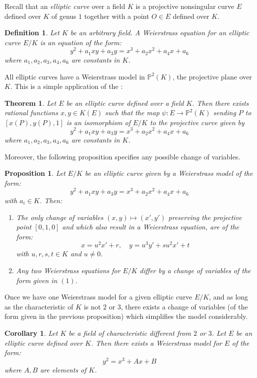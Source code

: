 \documentclass[12pt]{article}
\newtheorem*{thm}{Theorem}
\newtheorem*{defn}{Definition}
\newtheorem{prop}{Proposition}
\newtheorem*{cor}{Corollary}
\theoremstyle{definition}
\begin{document}
Recall that an {\it elliptic curve} over a field $K$ is a projective nonsingular curve $E$ defined over $K$ of genus $1$ together with a point $O\in E$ defined over $K$. 

\begin{defn}
Let $K$ be an arbitrary field. A Weierstrass equation for an elliptic curve $E/K$ is an equation of the form:
$$y^2+a_1xy+a_3y=x^3+a_2x^2+a_4x+a_6$$
where $a_1, a_2, a_3,a_4,a_6$ are constants in $K$.
\end{defn}

All elliptic curves have a Weierstrass model in $\mathbb{P}^2(K)$, the projective plane over $K$. This is a simple application of the :

\begin{thm}
Let $E$ be an elliptic curve defined over a field $K$. Then there exists rational functions $x,y\in K(E)$ such that the map $\psi:E\to \mathbb{P}^2(K)$ sending $P$ to $[x(P),y(P),1]$ is an isomorphism of $E/K$ to the projective curve given by
$$ y^2+a_1xy+a_3y=x^3+a_2x^2+a_4x+a_6$$
where $a_1, a_2, a_3,a_4,a_6$ are constants in $K$.
\end{thm}

Moreover, the following proposition specifies any possible change of variables.
\begin{prop}
\label{change}
Let $E/K$ be an elliptic curve given by a Weierstrass model of the form:
$$ y^2+a_1xy+a_3y=x^3+a_2x^2+a_4x+a_6$$
with $a_i\in K$. Then:
\begin{enumerate}
\item The only change of variables $(x,y)\mapsto (x',y')$ preserving the projective point $[0,1,0]$ and  which also result in a Weierstrass equation, are of the form:
$$x=u^2x'+r,\quad y=u^3y'+su^2x'+t$$ 
with $u,r,s,t\in K$ and $u\neq 0$.

\item Any two Weierstrass equations for $E/K$ differ by a change of variables of the form given in $(1)$.
\end{enumerate}
\end{prop}

Once we have one Weierstrass model for a given elliptic curve $E/K$, and as long as the characteristic of $K$ is not $2$ or $3$, there exists a change of variables (of the form given in the previous proposition) which simplifies the model considerably.

\begin{cor}
Let $K$ be a field of characteristic different from $2$ or $3$. Let $E$ be an elliptic curve defined over $K$. Then there exists a Weierstrass model for $E$ of the form:
$$y^2=x^3+Ax+B$$
where $A,B$ are elements of $K$.
\end{cor}
\end{document}
